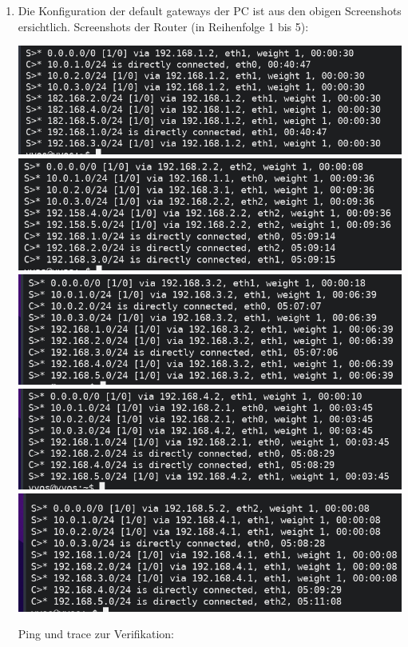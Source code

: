 \documentclass{article}
\begin{document}
\begin{enumerate}
    \item Die Konfiguration der default gateways der PC ist aus den obigen Screenshots ersichtlich. Screenshots der Router (in Reihenfolge 1 bis 5):
    
    \begin{center}
        \includegraphics[width=.45\textwidth]{img/rr1.png}
        \includegraphics[width=.45\textwidth]{img/rr2.png}
        \includegraphics[width=.45\textwidth]{img/rr3.png}
        \includegraphics[width=.45\textwidth]{img/rr4.png}
        \includegraphics[width=.45\textwidth]{img/rr5.png}
    \end{center}

    Ping und trace zur Verifikation:


\end{enumerate}
\end{document}

